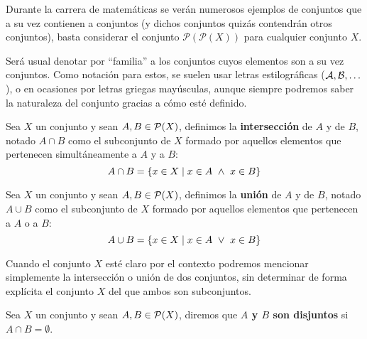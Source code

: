 Durante la carrera de matemáticas se verán numerosos ejemplos de conjuntos que a su vez contienen a conjuntos (y dichos conjuntos quizás contendrán otros conjuntos), basta considerar el conjunto $\mathcal{P}(\mathcal{P}(X))$ para cualquier conjunto $X$. 

Será usual denotar por ``familia'' a los conjuntos cuyos elementos son a su vez conjuntos. Como notación para estos, se suelen usar letras estilográficas ($\mathcal{A}, \mathcal{B}, \ldots$), o en ocasiones por letras griegas mayúsculas, aunque siempre podremos saber la naturaleza del conjunto gracias a cómo esté definido.

\begin{definicion}[Intersección]
    Sea $X$ un conjunto y sean $A, B \in \mathcal{P}(X)$, definimos la \textbf{intersección} de $A$ y de $B$, notado
    $A \cap B$ como el subconjunto de $X$ formado por aquellos elementos que pertenecen simultáneamente
    a $A$ y a $B$:
    $$A \cap B = \{x \in X \mid x \in A \ \land \  x \in B\}$$
\end{definicion}

\begin{definicion}[Unión]
    Sea $X$ un conjunto y sean $A, B \in \mathcal{P}(X)$, definimos la \textbf{unión} de $A$ y de $B$, notado
    $A \cup B$ como el subconjunto de $X$ formado por aquellos elementos que pertenecen a $A$ o a $B$:
    $$A \cup B = \{x \in X \mid x \in A \ \lor \  x \in B\}$$
\end{definicion}

Cuando el conjunto $X$ esté claro por el contexto podremos mencionar simplemente la intersección o unión de dos conjuntos, sin determinar de forma explícita el conjunto $X$ del que ambos son subconjuntos.

\begin{definicion}[Disjuntos]
    Sea $X$ un conjunto y sean $A, B \in \mathcal{P}(X)$, diremos que \textbf{$A$ y $B$ son disjuntos} si
    $A \cap B = \emptyset$.
\end{definicion}

